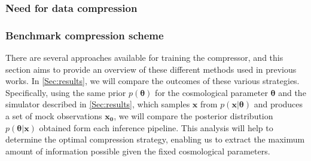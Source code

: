 \documentclass{aa}
\begin{document}
\subsubsection{Need for data compression}
\subsubsection{Benchmark compression scheme}
There are several approaches available for training the compressor, and this section aims to provide an overview of these different methods used in previous works. 
In \autoref{Sec:results}, we will compare the outcomes of these various strategies. Specifically, using the same prior $p(\bm {\theta})$ for the cosmological parameter $\bm{\theta}$ and the simulator described in \autoref{Sec:results}, which samples $\bm {x}$ from $p(\bm{x}| \bm{\theta})$ and produces a set of mock observations $\bm{x_0}$, we will compare the posterior distribution $p(\bm{\theta}|\bm{x})$ obtained form each inference pipeline. This analysis will help to determine the optimal compression strategy, enabling us to extract the maximum amount of information possible given the fixed cosmological parameters.
\end{document}
